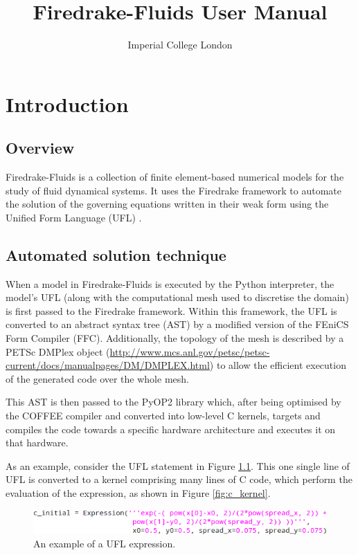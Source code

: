 \documentclass[a4paper,11pt]{report}
\title{Firedrake-Fluids User Manual}
\author{Imperial College London}
\begin{document}
\maketitle
\tableofcontents

\setlength{\parskip}{0.3cm}
\setlength{\parindent}{0cm}

\chapter{Introduction}
\section{Overview}
Firedrake-Fluids is a collection of finite element-based numerical models for the study of fluid dynamical systems. It uses the Firedrake framework \citep{ImperialCollegeLondon_2013, Rathgeber_Submitted} to automate the solution of the governing equations written in their weak form using the Unified Form Language (UFL) \citep{Alnaes_etal_2014}.

\section{Automated solution technique}
When a model in Firedrake-Fluids is executed by the Python interpreter, the model's UFL (along with the computational mesh used to discretise the domain) is first passed to the Firedrake framework. Within this framework, the UFL is converted to an abstract syntax tree (AST) by a modified version of the FEniCS Form Compiler (FFC). Additionally, the topology of the mesh is described by a PETSc DMPlex object (\url{http://www.mcs.anl.gov/petsc/petsc-current/docs/manualpages/DM/DMPLEX.html}) to allow the efficient execution of the generated code over the whole mesh.

 This AST is then passed to the PyOP2 library \citep{Rathgeber_etal_2012, Markall_etal_2013} which, after being optimised by the COFFEE compiler and converted into low-level C kernels, targets and compiles the code towards a specific hardware architecture and executes it on that hardware.

As an example, consider the UFL statement in Figure \ref{fig:ufl_expression}. This one single line of UFL is converted to a kernel comprising many lines of C code, which perform the evaluation of the expression, as shown in Figure \ref{fig:c_kernel}.

\begin{figure}
   \centering
   \includegraphics[width=0.75\columnwidth]{images/ufl_expression.png}
   \caption{An example of a UFL expression.}
   \label{fig:ufl_expression}
\end{figure}
\end{document}
